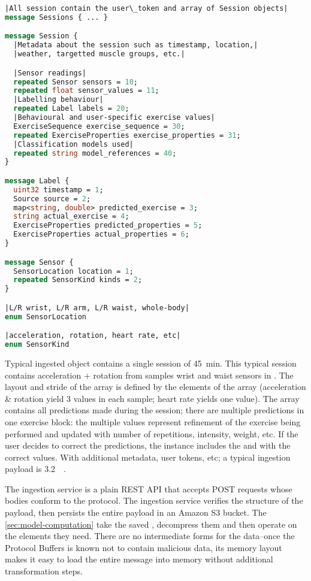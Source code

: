 \begin{lstlisting}[caption={Session protocol}, label={code:session-protocol}, language=protobuf, escapechar=|]
|All session contain the user\_token and array of Session objects|
message Sessions { ... }

message Session {
  |Metadata about the session such as timestamp, location,|
  |weather, targetted muscle groups, etc.|

  |Sensor readings|
  repeated Sensor sensors = 10;
  repeated float sensor_values = 11;
  |Labelling behaviour|
  repeated Label labels = 20;  
  |Behavioural and user-specific exercise values|
  ExerciseSequence exercise_sequence = 30;
  repeated ExerciseProperties exercise_properties = 31;
  |Classification models used|
  repeated string model_references = 40;
}

message Label {
  uint32 timestamp = 1;
  Source source = 2;
  map<string, double> predicted_exercise = 3; 
  string actual_exercise = 4;
  ExerciseProperties predicted_properties = 5;
  ExerciseProperties actual_properties = 6;
}

message Sensor {
  SensorLocation location = 1;
  repeated SensorKind kinds = 2;
}

|L/R wrist, L/R arm, L/R waist, whole-body|
enum SensorLocation

|acceleration, rotation, heart rate, etc|
enum SensorKind 
\end{lstlisting}

Typical ingested  object contains a single session of \SI{45}{\minute}. This typical session contains acceleration + rotation from samples wrist and waist sensors in . The layout and stride of the  array is defined by the elements of the  array (acceleration \& rotation yield 3 values in each sample; heart rate yields one value). The  array contains all predictions made during the session; there are multiple predictions in one exercise block: the multiple values represent refinement of the exercise being performed and updated  with number of repetitions, intensity, weight, etc. If the user decides to correct the predictions, the  instance includes the  and  with the correct values. With additional metadata, user tokens, etc; a typical ingestion payload is \SI{3.2}{\mebi\byte}. 

The ingestion service is a plain REST API that accepts POST requests whose bodies conform to the  protocol. The ingestion service verifies the structure of the payload, then persists the entire payload in an Amazon S3 bucket. The \autoref{sec:model-computation} take the saved , decompress them and then operate on the elements they need. There are no intermediate forms for the data--once the Protocol Buffers is known not to contain malicious data, its memory layout makes it easy to load the entire message into memory without additional transformation steps.

